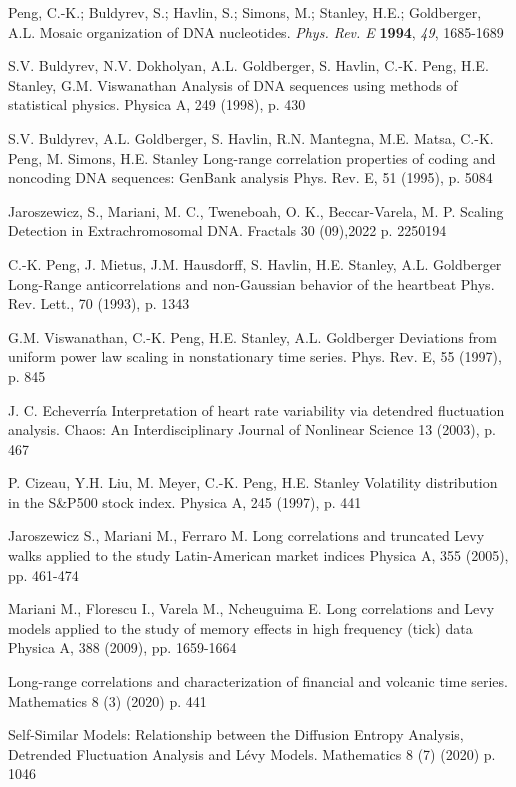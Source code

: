 \documentclass[onecolumn, preprint,aps,amsmath, amssymb, superscriptaddress]{revtex4}
\begin{document}
\begin{thebibliography}{99}
Peng, C.-K.; Buldyrev, S.; Havlin, S.; Simons, M.; Stanley, H.E.; Goldberger, A.L. Mosaic organization of DNA nucleotides. {\em Phys. Rev. E} {\bf 1994}, {\em 49}, 1685-1689

S.V. Buldyrev, N.V. Dokholyan, A.L. Goldberger, S. Havlin, C.-K. Peng, H.E. Stanley, G.M. Viswanathan
Analysis of DNA sequences using methods of statistical physics.
Physica A, 249 (1998), p. 430

S.V. Buldyrev, A.L. Goldberger, S. Havlin, R.N. Mantegna, M.E. Matsa, C.-K. Peng, M. Simons, H.E. Stanley
Long-range correlation properties of coding and noncoding DNA sequences: GenBank analysis
Phys. Rev. E, 51 (1995), p. 5084

 Jaroszewicz, S., Mariani, M. C., Tweneboah, O. K., Beccar-Varela, M. P. Scaling Detection in Extrachromosomal DNA. Fractals 30 (09),2022 p.  2250194

C.-K. Peng, J. Mietus, J.M. Hausdorff, S. Havlin, H.E. Stanley, A.L. Goldberger
Long-Range anticorrelations and non-Gaussian behavior of the heartbeat
Phys. Rev. Lett., 70 (1993), p. 1343

G.M. Viswanathan, C.-K. Peng, H.E. Stanley, A.L. Goldberger
Deviations from uniform power law scaling in nonstationary time series.
Phys. Rev. E, 55 (1997), p. 845

J. C. Echeverr\'ia
Interpretation of heart rate variability via detendred fluctuation analysis.
Chaos: An Interdisciplinary Journal of Nonlinear Science 13 (2003), p. 467

P. Cizeau, Y.H. Liu, M. Meyer, C.-K. Peng, H.E. Stanley
Volatility distribution in the S\&P500 stock index.
Physica A, 245 (1997), p. 441

Jaroszewicz S., Mariani M., Ferraro M.
Long correlations and truncated Levy walks applied to the study Latin-American market indices
Physica A, 355 (2005), pp. 461-474

Mariani M., Florescu I., Varela M., Ncheuguima E.
Long correlations and Levy models applied to the study of memory effects in high frequency (tick) data
Physica A, 388 (2009), pp. 1659-1664

 Long-range correlations and characterization of financial and volcanic time series. Mathematics 8 (3) (2020) p. 441

 Self-Similar Models: Relationship between the Diffusion Entropy Analysis, Detrended Fluctuation Analysis and Lévy Models. Mathematics 8 (7) (2020) p. 1046


\end{thebibliography}
\end{document}
